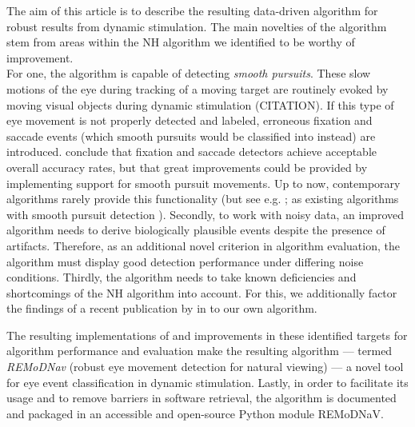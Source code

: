 The aim of this article is to describe the resulting data-driven algorithm for robust results from dynamic stimulation. The main novelties of the algorithm stem from areas within the NH algorithm we identified to be worthy of improvement.   \\ For one, the algorithm is capable of detecting \textit{smooth pursuits}. These slow motions of the eye during tracking of a moving target are routinely evoked by moving visual objects during dynamic stimulation (CITATION). If this type of eye movement is not properly detected and labeled, erroneous fixation and saccade events (which smooth pursuits would be classified into instead)  are introduced. \cite{Andersson2017} conclude that fixation and saccade detectors achieve acceptable overall accuracy rates, but that great improvements could be provided by implementing support for smooth pursuit movements. Up to now, contemporary algorithms rarely provide this functionality (but see e.g. \cite{LARSSON2015145}; \cite{Komogortsev2013} as existing algorithms with smooth pursuit detection ). Secondly, to work with noisy data, an improved algorithm needs to derive biologically plausible events despite the presence of artifacts. Therefore, as an additional novel criterion in algorithm evaluation, the algorithm must display good detection performance under differing noise conditions. Thirdly, the algorithm needs to take known deficiencies and shortcomings of the NH algorithm into account. For this, we additionally factor the findings of a recent publication by \cite{Friedman2018} in to our own algorithm. 


The resulting implementations of and improvements in these identified targets for algorithm performance and evaluation make the resulting algorithm --- termed \textit{REMoDNav} (robust eye movement detection for natural viewing) --- a novel tool for eye event classification in dynamic stimulation.
Lastly, in order to facilitate its usage and to remove barriers in software retrieval, the \remodnav algorithm is documented and packaged in an accessible and open-source Python module REMoDNaV. \\

